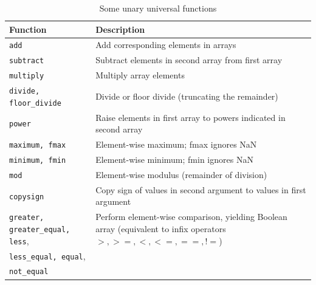 \begin{table}
    \caption{Some unary universal functions}
    \label{Some binary universal functions}
    \begin{tabularx}{\textwidth}{lX}
        \hline
        Function                    & Description                                                                                                   \\
        \hline
        \verb|add|                  & Add corresponding elements in arrays                                                                          \\
        \verb|subtract|             & Subtract elements in second array from first array                                                            \\
        \verb|multiply|             & Multiply array elements                                                                                       \\
        \verb|divide, floor_divide| & Divide or floor divide (truncating the remainder)                                                             \\
        \verb|power|                & Raise elements in first array to powers indicated in second array                                             \\
        \verb|maximum, fmax|        & Element-wise maximum; fmax ignores NaN                                                                        \\
        \verb|minimum, fmin|        & Element-wise minimum; fmin ignores NaN                                                                        \\
        \verb|mod|                  & Element-wise modulus (remainder of division)                                                                  \\
        \verb|copysign|             & Copy sign of values in second argument to values in first argument                                            \\
        \verb|greater, greater_equal, less|,             & Perform element-wise comparison, yielding Boolean array (equivalent to infix operators$>, >=, <, <=, ==, !=$) \\
        \verb|less_equal, equal|,   &                                                                                                               \\
        \verb|not_equal|            &                                                                                                               \\

\end{tabularx}
\end{table}

